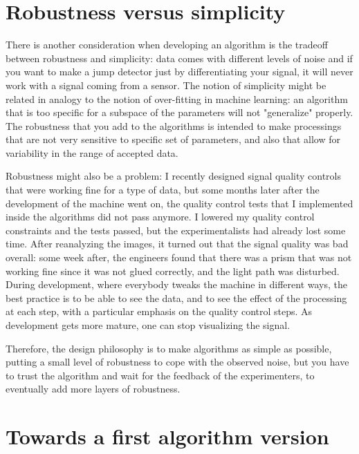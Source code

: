 \documentclass[24pt]{article}
\begin{document}
\section{Robustness versus simplicity}

There is another consideration when developing an algorithm is the tradeoff between robustness and simplicity: data comes with different levels of noise and if you want to make a jump detector just by differentiating your signal, it will never work with a signal coming from a sensor. The notion of simplicity might be related in analogy to the notion of over-fitting in machine learning: an algorithm that is too specific for a subspace of the parameters will not "generalize" properly. The robustness that you add to the algorithms is intended to make processings that are not very sensitive to specific set of parameters, and also that allow for variability in the 
range of accepted data.
 

Robustness might also be a problem: I recently designed signal quality controls  that were working fine for a type of data, but some months later after the development of the machine went on, the quality control tests that I implemented inside the algorithms did not pass anymore. I lowered my quality control constraints and the tests passed, but the experimentalists had already lost some time. After reanalyzing the images, it turned out that the signal quality was bad overall: some week after, the engineers found that  there was a prism that was not working fine since it was not glued correctly, and the light path was disturbed.
 During development, where everybody tweaks the machine in different ways, the best practice is to be able to see the data, and to see the effect of the processing at each step, with a particular emphasis on the quality control steps. As development gets more mature, one can stop visualizing the signal.

Therefore, the design philosophy is to make algorithms as simple as possible, putting a small level of robustness to cope with the observed noise, but you have to  trust the algorithm and wait for the feedback of the experimenters, to eventually add more layers of robustness. 

\section{Towards a first algorithm version}
\end{document}

